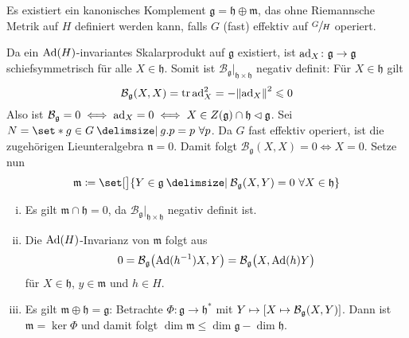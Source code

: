 \begin{lemma}
	Es existiert ein kanonisches Komplement $\mathfrak{g} = \mathfrak{h} \oplus \mathfrak{m}$, das ohne Riemannsche Metrik auf $H$ definiert werden kann, falls $G$ (fast) effektiv auf $\sfrac{G}{H}$ operiert.
\end{lemma}
\begin{beweis}
	Da ein $\Ad(H)$-invariantes Skalarprodukt auf $\mathfrak{g}$ existiert, ist $\ad_X \colon \mathfrak{g} \to \mathfrak{g}$ schiefsymmetrisch für alle $X \in \mathfrak{h}$.
	Somit ist $\mathcal{B}_{\mathfrak{g}}|_{\mathfrak{h} \times \mathfrak{h}}$ negativ definit:
	Für $X \in \mathfrak{h}$ gilt
	\[
		\mathcal{B}_{\mathfrak{g}}(X,X) = \tr \ad_X^2 = - \norm*{\ad_X}^2 \le 0
	\]
	Also ist $\mathcal{B}_{\mathfrak{g}}=0 \iff \ad_X =0 \iff X \in Z(\mathfrak{g}) \cap \mathfrak{h} \lhd \mathfrak{g}$.
	Sei $N = \set*{g \in G\given g.p = p \,\, \forall p}$.
	Da $G$ fast effektiv operiert, ist die zugehörigen Lieunteralgebra $\mathfrak{n} =0$.
	Damit folgt $\mathcal{B}_{\mathfrak{g}}(X,X) =0 \iff X=0$.
	Setze nun
	\[
		\mathfrak{m} \coloneqq \set[\big]{Y \in \mathfrak{g} \given \mathcal{B}_{\mathfrak{g}}(X,Y) =0 \, \, \forall X \in \mathfrak{h}}
	\]
	\begin{enumerate}[(i)]
		\item Es gilt $\mathfrak{m} \cap \mathfrak{h} =0$, da $\mathcal{B}_{\mathfrak{g}}|_{\mathfrak{h} \times \mathfrak{h}}$ negativ definit ist.
		\item Die $\Ad(H)$-Invarianz von $\mathfrak{m}$ folgt aus
		\[
			0 = \mathcal{B}_{\mathfrak{g}} \enbrace*{\Ad (h^{-1})X,Y} = \mathcal{B}_{\mathfrak{g}} \enbrace[\big]{X, \Ad(h) Y}
		\]
		für $X \in \mathfrak{h}$, $y \in \mathfrak{m}$ und $h \in H$.
		\item Es gilt $\mathfrak{m} \oplus \mathfrak{h} = \mathfrak{g}$: 
		Betrachte $\Phi \colon \mathfrak{g} \to \mathfrak{h}^*$ mit $Y \mapsto \benbrace*{X \mapsto \mathcal{B}_{\mathfrak{g}}(X,Y)}$.
		Dann ist $\mathfrak{m} = \ker \Phi$ und damit folgt $\dim \mathfrak{m} \le \dim \mathfrak{g} - \dim \mathfrak{h}$.\qedhere
	\end{enumerate}
\end{beweis}

